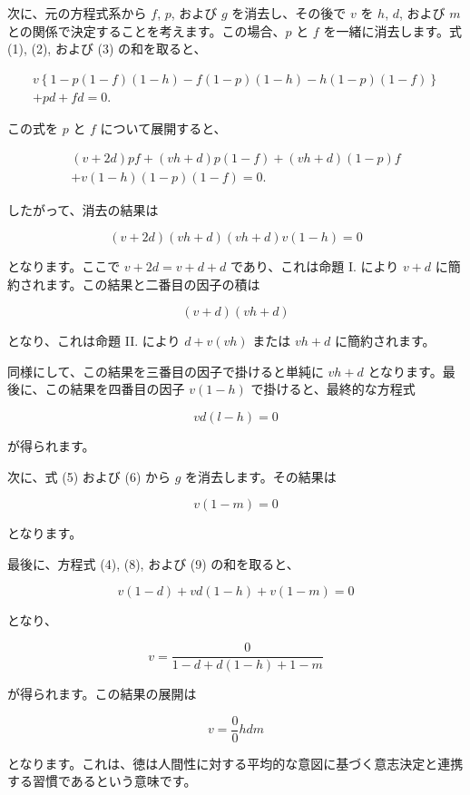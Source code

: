 \documentclass[a4paper,11pt,openany]{ltjsbook}
\begin{document}
次に、元の方程式系から $f$, $p$, および $g$ を消去し、その後で $v$ を $h$, $d$, および $m$ との関係で決定することを考えます。この場合、$p$ と $f$ を一緒に消去します。式 (1), (2), および (3) の和を取ると、

\begin{eqnarray*}
v \left\{ 1 - p(1-f)(1-h) - f(1-p)(1-h) - h(1-p)(1-f) \right\} \\
+ pd + fd = 0.
\end{eqnarray*}

この式を $p$ と $f$ について展開すると、

\begin{eqnarray*}
(v + 2d)pf + (vh + d)p(1-f) + (vh + d)(1-p)f \\
+ v(1-h)(1-p)(1-f) = 0.
\end{eqnarray*}

したがって、消去の結果は

\[
(v + 2d)(vh + d)(vh + d)v(1 - h) = 0
\]

となります。ここで $v + 2d = v + d + d$ であり、これは命題 I. により $v + d$ に簡約されます。この結果と二番目の因子の積は

\[
(v + d)(vh + d)
\]

となり、これは命題 II. により $d + v(vh)$ または $vh + d$ に簡約されます。

同様にして、この結果を三番目の因子で掛けると単純に $vh + d$ となります。最後に、この結果を四番目の因子 $v(1-h)$ で掛けると、最終的な方程式

\begin{equation}
vd(l - h) = 0
\end{equation}

が得られます。

次に、式 (5) および (6) から $g$ を消去します。その結果は

\begin{equation}
v(1-m) = 0
\end{equation}

となります。

最後に、方程式 (4), (8), および (9) の和を取ると、

\[
v(1-d) + vd(1-h) + v(1-m) = 0
\]

となり、

\[
v = \frac{0}{1 - d + d(1-h) + 1 - m}
\]

が得られます。この結果の展開は

\[
v = \frac{0}{0}hdm
\]

となります。これは、徳は人間性に対する平均的な意図に基づく意志決定と連携する習慣であるという意味です。
\end{document}
